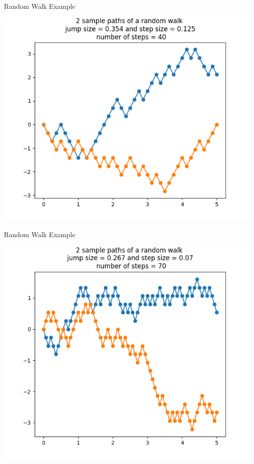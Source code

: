\documentclass{beamer}%
\numberwithin{equation}{section}
\begin{document}
\begin{frame}{Random Walk Example}
	\begin{center}
		\includegraphics[scale=.6]{randomwalk2.png}
	\end{center}
\end{frame}

\begin{frame}{Random Walk Example}
	\begin{center}
		\includegraphics[scale=.55]{randomwalk3.png}
	\end{center}
\end{frame}
\end{document}
